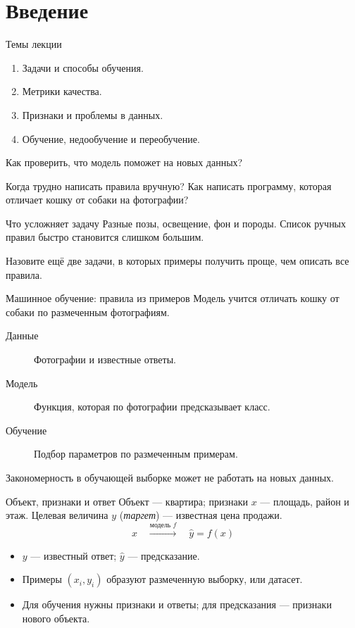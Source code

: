 \section{Введение}

\begin{frame}{Темы лекции}
  \begin{enumerate}
    \item Задачи и способы обучения.
    \item Метрики качества.
    \item Признаки и проблемы в данных.
    \item Обучение, недообучение и переобучение.
  \end{enumerate}
  \medskip
  Как проверить, что модель поможет на новых данных?
\end{frame}

\begin{frame}{Когда трудно написать правила вручную?}
  Как написать программу, которая отличает кошку от собаки на фотографии?
  \begin{block}{Что усложняет задачу}
    Разные позы, освещение, фон и породы. Список ручных правил быстро становится слишком большим.
  \end{block}
  \medskip
  Назовите ещё две задачи, в которых примеры получить проще, чем описать все правила.
\end{frame}

\begin{frame}{Машинное обучение: правила из примеров}
  Модель учится отличать кошку от собаки по размеченным фотографиям.
  \begin{description}
    \item[Данные] Фотографии и известные ответы.
    \item[Модель] Функция, которая по фотографии предсказывает класс.
    \item[Обучение] Подбор параметров по размеченным примерам.
  \end{description}
  \medskip
  Закономерность в обучающей выборке может не работать на новых данных.
\end{frame}

\begin{frame}{Объект, признаки и ответ}
  Объект --- квартира; признаки $x$ --- площадь, район и этаж.
  Целевая величина $y$ (\emph{таргет}) --- известная цена продажи.
  \[
    x \quad\xrightarrow{\text{модель } f}\quad \widehat y=f(x)
  \]
  \begin{itemize}
    \item $y$ --- известный ответ; $\widehat y$ --- предсказание.
    \item Примеры $(x_i,y_i)$ образуют размеченную выборку, или датасет.
    \item Для обучения нужны признаки и ответы; для предсказания --- признаки нового объекта.
  \end{itemize}
\end{frame}
